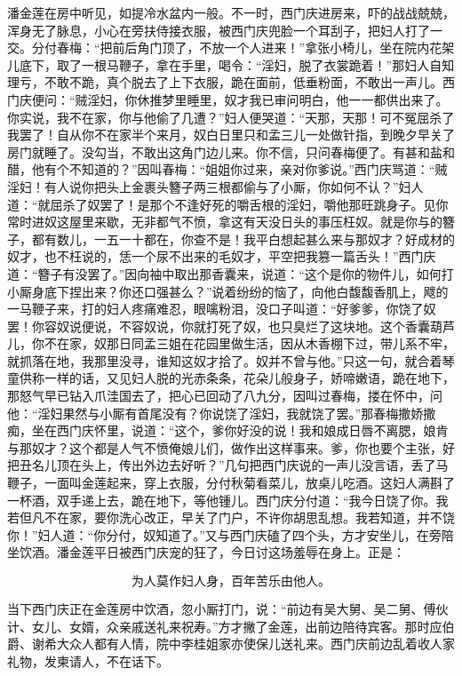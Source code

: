 潘金莲在房中听见，如提冷水盆内一般。不一时，西门庆进房来，吓的战战兢兢，浑身无了脉息，小心在旁扶侍接衣服，被西门庆兜脸一个耳刮子，把妇人打了一交。分付春梅：“把前后角门顶了，不放一个人进来！”拿张小椅儿，坐在院内花架儿底下，取了一根马鞭子，拿在手里，喝令：“淫妇，脱了衣裳跪着！”那妇人自知理亏，不敢不跪，真个脱去了上下衣服，跪在面前，低垂粉面，不敢出一声儿。西门庆便问：“贼淫妇，你休推梦里睡里，奴才我已审问明白，他一一都供出来了。你实说，我不在家，你与他偷了几遭？”妇人便哭道：“天那，天那！可不冤屈杀了我罢了！自从你不在家半个来月，奴白日里只和孟三儿一处做针指，到晚夕早关了房门就睡了。没勾当，不敢出这角门边儿来。你不信，只问春梅便了。有甚和盐和醋，他有个不知道的？”因叫春梅：“姐姐你过来，亲对你爹说。”西门庆骂道：“贼淫妇！有人说你把头上金裹头簪子两三根都偷与了小厮，你如何不认？”妇人道：“就屈杀了奴罢了！是那个不逢好死的嚼舌根的淫妇，嚼他那旺跳身子。见你常时进奴这屋里来歇，无非都气不愤，拿这有天没日头的事压枉奴。就是你与的簪子，都有数儿，一五一十都在，你查不是！我平白想起甚么来与那奴才？好成材的奴才，也不枉说的，恁一个尿不出来的毛奴才，平空把我篡一篇舌头！”西门庆道：“簪子有没罢了。”因向袖中取出那香囊来，说道：“这个是你的物件儿，如何打小厮身底下捏出来？你还口强甚么？”说着纷纷的恼了，向他白馥馥香肌上，飕的一马鞭子来，打的妇人疼痛难忍，眼噙粉泪，没口子叫道：“好爹爹，你饶了奴罢！你容奴说便说，不容奴说，你就打死了奴，也只臭烂了这块地。这个香囊葫芦儿，你不在家，奴那日同孟三姐在花园里做生活，因从木香棚下过，带儿系不牢，就抓落在地，我那里没寻，谁知这奴才拾了。奴并不曾与他。”只这一句，就合着琴童供称一样的话，又见妇人脱的光赤条条，花朵儿般身子，娇啼嫩语，跪在地下，那怒气早已钻入爪洼国去了，把心已回动了八九分，因叫过春梅，搂在怀中，问他：“淫妇果然与小厮有首尾没有？你说饶了淫妇，我就饶了罢。”那春梅撒娇撒痴，坐在西门庆怀里，说道：“这个，爹你好没的说！我和娘成日唇不离腮，娘肯与那奴才？这个都是人气不愤俺娘儿们，做作出这样事来。爹，你也要个主张，好把丑名儿顶在头上，传出外边去好听？”几句把西门庆说的一声儿没言语，丢了马鞭子，一面叫金莲起来，穿上衣服，分付秋菊看菜儿，放桌儿吃酒。这妇人满斟了一杯酒，双手递上去，跪在地下，等他锺儿。西门庆分付道：“我今日饶了你。我若但凡不在家，要你洗心改正，早关了门户，不许你胡思乱想。我若知道，并不饶你！”妇人道：“你分付，奴知道了。”又与西门庆磕了四个头，方才安坐儿，在旁陪坐饮酒。潘金莲平日被西门庆宠的狂了，今日讨这场羞辱在身上。正是：

\[
为人莫作妇人身，百年苦乐由他人。
\]

当下西门庆正在金莲房中饮酒，忽小厮打门，说：“前边有吴大舅、吴二舅、傅伙计、女儿、女婿，众亲戚送礼来祝寿。”方才撇了金莲，出前边陪待宾客。那时应伯爵、谢希大众人都有人情，院中李桂姐家亦使保儿送礼来。西门庆前边乱着收人家礼物，发柬请人，不在话下。

